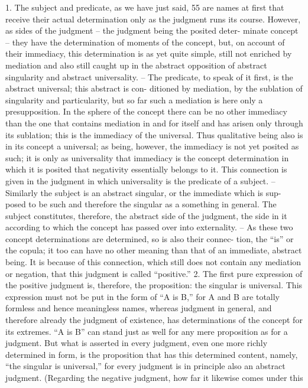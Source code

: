 1. The subject and predicate, as we have just said, 55 are names at first that
receive their actual determination only as the judgment runs its course.
However, as sides of the judgment – the judgment being the posited deter-
minate concept – they have the determination of moments of the concept,
but, on account of their immediacy, this determination is as yet quite
simple, still not enriched by mediation and also still caught up in the
abstract opposition of abstract singularity and abstract universality. – The
predicate, to speak of it first, is the abstract universal; this abstract is con-
ditioned by mediation, by the sublation of singularity and particularity,
but so far such a mediation is here only a presupposition. In the sphere of
the concept there can be no other immediacy than the one that contains
mediation in and for itself and has arisen only through its sublation; this is
the immediacy of the universal. Thus qualitative being also is in its concept
a universal; as being, however, the immediacy is not yet posited as such;
it is only as universality that immediacy is the concept determination in
which it is posited that negativity essentially belongs to it. This connection
is given in the judgment in which universality is the predicate of a subject. –
Similarly the subject is an abstract singular, or the immediate which is sup-
posed to be such and therefore the singular as a something in general. The
subject constitutes, therefore, the abstract side of the judgment, the side
in it according to which the concept has passed over into externality. – As
these two concept determinations are determined, so is also their connec-
tion, the “is” or the copula; it too can have no other meaning than that of
an immediate, abstract being. It is because of this connection, which still
does not contain any mediation or negation, that this judgment is called
“positive.”
2. The first pure expression of the positive judgment is, therefore, the
proposition: the singular is universal. This expression must not be put in
the form of “A is B,” for A and B are totally formless and hence meaningless
names, whereas judgment in general, and therefore already the judgment
of existence, has determinations of the concept for its extremes. “A is B”
can stand just as well for any mere proposition as for a judgment. But what
is asserted in every judgment, even one more richly determined in form,
is the proposition that has this determined content, namely, “the singular
is universal,” for every judgment is in principle also an abstract judgment.
(Regarding the negative judgment, how far it likewise comes under this
